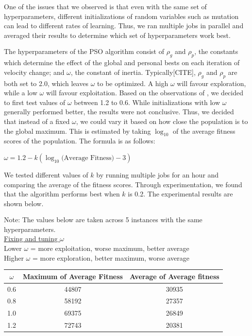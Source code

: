 \documentclass{article}
\begin{document}
	One of the issues that we observed is that even with the same set of hyperparameters,
	different initializations of random variables such as mutation can lead to
	different rates of learning. Thus, we ran multiple jobs in parallel and averaged
	their results to determine which set of hyperparameters work best.

	The hyperparameters of the PSO algorithm consist of $\rho_g$ and $\rho_p$, the constants
	which determine the effect of the global and personal bests on each iteration
	of velocity change; and $\omega$, the constant of inertia. Typically[CITE], $\rho_g$ and $\rho_p$ are both
	set to 2.0, which leaves $\omega$ to be optimized. A high $\omega$ will favour exploration,
	while a low $\omega$ will favour exploitation. Based on the observations of \cite{shi1998parameter}, we decided to first test values of $\omega$ between 1.2 to 0.6.
	While initializations with low $\omega$ generally performed better, the results were
	not conclusive. Thus, we decided that instead of a fixed $\omega$, we could vary it
	based on how close the population is to the global maximum. This is estimated
	by taking $\log_{10}$ of the average fitness scores of the population. The formula is as follows:

	\begin{center}
		$\omega = 1.2 - k(\log_{10}\text{(Average Fitness)} - 3)$
	\end{center}

	We tested different values of $k$ by running multiple jobs for an hour and comparing
 	the average of the fitness scores. Through experimentation, we found that the
	algorithm performs best when $k$ is 0.2. The experimental results are shown below.

	Note: The values below are taken across 5 instances with the same hyperparameters.\\

	\underline{Fixing and tuning $\omega$}\\
	Lower $\omega$ = more exploitation, worse maximum, better average\\
	Higher $\omega$ = more exploration, better maximum, worse average\\

	\begin{tabular}{ | c | c | c | }
		\hline
		$\omega$ & Maximum of Average Fitness & Average of Average fitness \\ \hline
		0.6 & 44807 & 30935 \\ \hline
		0.8 & 58192 & 27357 \\ \hline
		1.0 & 69375 & 26849 \\ \hline
		1.2 & 72743 & 20381 \\ \hline
	\end{tabular}\\[0.5em]
\end{document}
